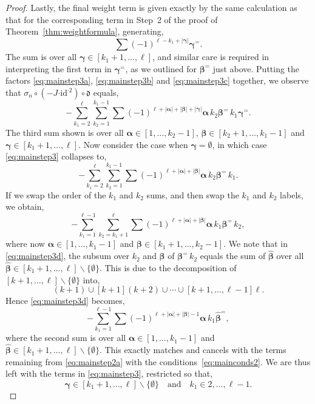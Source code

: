 \documentclass[5p,twocolumn]{elsarticle}
\newcommand*{\id}{{\mathrm{id}}}
\newcommand*{\df}{\mathfrak d}
\newcommand*{\cendot}{\boldsymbol{\cdot}}
\newcommand*{\balpha}{\boldsymbol{\alpha}}
\newcommand*{\bbeta}{\boldsymbol{\beta}}
\newcommand*{\bgamma}{\boldsymbol{\gamma}}
\begin{document}
\begin{proof}
Lastly, the final weight term is given exactly by the same calculation as that for the corresponding term in Step~2 of the proof of Theorem~\ref{thm:weightformula}, generating,
\begin{equation}\label{eq:mainstep3c}
    \sum(-1)^{\ell-k_1+|\bgamma|}\bgamma^=.
\end{equation}
The sum is over all $\bgamma\in[k_1+1,\ldots,\ell]$, and similar care is required in interpreting the first term in $\bgamma^=$, as we outlined for $\bbeta^=$ just above. 
Putting the factors \eqref{eq:mainstep3a}, \eqref{eq:mainstep3b} and \eqref{eq:mainstep3c} together, we observe that $\sigma_n\circ(-J\cendot\id^{\cendot2})\circ\df$ equals,
\begin{equation}\label{eq:mainstep3}
   -\sum_{k_1=2}^\ell\sum_{k_2=1}^{k_1-1}\sum(-1)^{\ell+|\balpha|+|\bbeta|+|\bgamma|}\balpha\,k_2\bbeta^=\,k_1\bgamma^=.
\end{equation}
The third sum shown is over all $\balpha\in[1,\ldots,k_2-1]$, $\bbeta\in[k_2+1,\ldots,k_1-1]$ and $\bgamma\in[k_1+1,\ldots,\ell]$.
Now consider the case when $\bgamma=\emptyset$, in which case \eqref{eq:mainstep3} collapses to,
\begin{equation*}
   -\sum_{k_1=2}^\ell\sum_{k_2=1}^{k_1-1}\sum(-1)^{\ell+|\balpha|+|\bbeta|}\balpha\,k_2\bbeta^=\,k_1.
\end{equation*}
If we swap the order of the $k_1$ and $k_2$ sums, and then swap the $k_1$ and $k_2$ labels, we obtain,
\begin{equation}\label{eq:mainstep3d}
   -\sum_{k_1=1}^{\ell-1}\sum_{k_2=k_1+1}^{\ell}\sum(-1)^{\ell+|\balpha|+|\bbeta|}\balpha\,k_1\bbeta^=\,k_2,
\end{equation}
where now $\balpha\in[1,\ldots,k_1-1]$ and $\bbeta\in[k_1+1,\ldots,k_2-1]$.
We note that in \eqref{eq:mainstep3d}, the subsum over $k_2$ and $\bbeta$ of $\bbeta^=\,k_2$ equals the sum of $\hat{\bbeta}$
over all $\hat{\bbeta}\in[k_1+1,\ldots,\ell]\backslash\{\emptyset\}$. This is due to the decomposition of $[k+1,\ldots,\ell]\backslash\{\emptyset\}$ into,
\begin{equation}\label{eq:decomp}
(k+1)\cup[k+1](k+2)\cup\cdots\cup[k+1,\ldots,\ell-1]\ell.
\end{equation}
Hence \eqref{eq:mainstep3d} becomes,
\begin{equation}\label{eq:mainstep3e}
   -\sum_{k_1=1}^{\ell-1}\sum(-1)^{\ell+|\balpha|+|\bbeta|-1}\balpha\,k_1\hat{\bbeta}^=,
\end{equation}
where the second sum is over all $\balpha\in[1,\ldots,k_1-1]$ and $\hat{\bbeta}\in[k_1+1,\ldots,\ell]\backslash\{\emptyset\}$.
This exactly matches and cancels with the terms remaining from \eqref{eq:mainstep2a} with the conditions~\eqref{eq:mainconds2}.
We are thus left with the terms in \eqref{eq:mainstep3}, restricted so that,
\begin{equation}\label{eq:mainconds3}
\bgamma\in[k_1+1,\ldots,\ell]\backslash\{\emptyset\}\quad\text{and}\quad k_1\in2,\ldots,\ell-1. 
\end{equation}


\end{proof}
\end{document}
